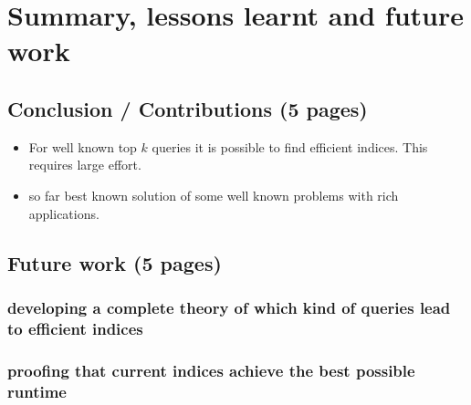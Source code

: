 \documentclass[•]{book}
\begin{document}
\part{Summary, lessons learnt and future work}

\chapter{Conclusion / Contributions (5 pages)}
\begin{itemize}
\item For well known top $k$ queries it is possible to find efficient indices. This requires large effort. 
\item so far best known solution of some well known problems with rich applications. 
\end{itemize}
\chapter{Future work (5 pages)}
\section{developing a complete theory of which kind of queries lead to efficient indices}
\section{proofing that current indices achieve the best possible runtime}



\end{document}
